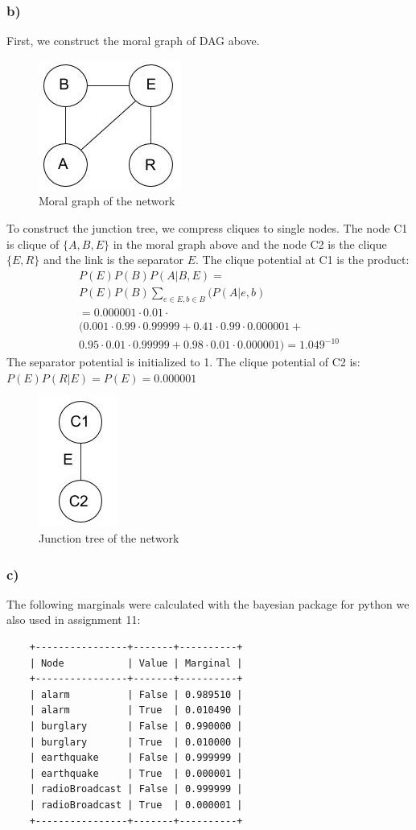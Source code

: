 \documentclass[11pt,a4paper]{article}
\begin{document}
\subsubsection*{b)}
First, we construct the moral graph of DAG above.
	\begin{figure}[h]
		\caption{Moral graph of the network}
		\centering
		\includegraphics[width=.3\textwidth]{MORAL}
	\end{figure}
\newpage
To construct the junction tree, we compress cliques to single nodes. The node C1 is clique of $\{A, B, E\}$ in the moral graph above and the node C2 is the clique $\{E, R\}$ and the link is the separator $E$. The clique potential at C1 is the product:
\begin{equation*}
\begin{split}
P(E)P(B)P(A|B,E)=\\
P(E)P(B)\sum_{e \in E, b \in B}(P(A|e, b)\\
=0.000001\cdot 0.01\cdot\\
(0.001\cdot0.99\cdot0.99999+0.41\cdot0.99\cdot0.000001+\\
0.95\cdot0.01\cdot0.99999+0.98\cdot0.01\cdot0.000001) = 1.049^{-10}
\end{split}
\end{equation*}
The separator potential is initialized to 1. The clique potential of C2 is: $P(E)P(R|E)=P(E)=0.000001$
\begin{figure}[h]
	\caption{Junction tree of the network}
	\centering
	\includegraphics[width=.2\textwidth]{junction}
\end{figure}
\subsubsection*{c)}
The following marginals were calculated with the bayesian package for python we also used in assignment 11:
	\begin{verbatim}
	+----------------+-------+----------+
	| Node           | Value | Marginal |
	+----------------+-------+----------+
	| alarm          | False | 0.989510 |
	| alarm          | True  | 0.010490 |
	| burglary       | False | 0.990000 |
	| burglary       | True  | 0.010000 |
	| earthquake     | False | 0.999999 |
	| earthquake     | True  | 0.000001 |
	| radioBroadcast | False | 0.999999 |
	| radioBroadcast | True  | 0.000001 |
	+----------------+-------+----------+
	\end{verbatim}
\end{document}
